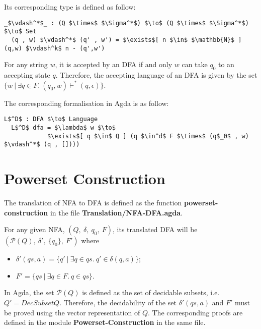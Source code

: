 \par Its corresponding type is defined as follow: 
\begin{lstlisting}[mathescape=true,xleftmargin=.1\textwidth]
  _$\vdash^*$_ : (Q $\times$ $\Sigma^*$) $\to$ (Q $\times$ $\Sigma^*$) $\to$ Set
  (q , w) $\vdash^*$ (q' , w') = $\exists$[ n $\in$ $\mathbb{N}$ ] (q,w) $\vdash^k$ n - (q',w')
\end{lstlisting}

\begin{defn}
\noindent For any string \(w\), it is accepted by an DFA
if and only \(w\) can take \(q_0\) to an accepting state \(q\). Therefore, the
accepting language of an DFA is given by the set \(\{w\ |\ \exists q\in F.\ (q_0,w) \vdash^* (q,\epsilon)\}\). 
\end{defn}

\par The corresponding formalisation in Agda is as follow: 
\begin{lstlisting}[mathescape=true,xleftmargin=.1\textwidth]
  L$^D$ : DFA $\to$ Language
  L$^D$ dfa = $\lambda$ w $\to$ 
            $\exists$[ q $\in$ Q ] (q $\in^d$ F $\times$ (q$_0$ , w) $\vdash^*$ (q , [])))
\end{lstlisting} 


\section{Powerset Construction}
\par The translation of NFA to DFA is defined as the function
\textbf{powerset-construction} in the file \textbf{Translation/NFA-DFA.agda}. 

\begin{defn}
\label{defn:powerset}
\noindent For any given NFA, \((Q,\ \delta,\ q_0,\ F)\), its
translated DFA will be \((\mathcal P \left({Q}\right),\ \delta',\ \{q_0\},\ F')\) where
\begin{itemize}[nolistsep]
  \item \(\delta'(qs,a) = \{q'\ |\ \exists q\in qs.\ q' \in \delta (q,a)\}\);
  \item \(F' = \{qs\ |\ \exists q\in F.\ q \in qs\}\). 
\end{itemize}
\end{defn}

\par In Agda, the set \(\mathcal P \left({Q}\right)\) is defined as
the set of decidable subsets, i.e. \(Q' = DecSubset Q\). Therefore,
the decidability of the set \(\delta'(qs,a)\) and \(F'\) must be
proved using the vector representation of \(Q\). The corresponding
proofs are defined in the module \textbf{Powerset-Construction} in the
same file. 

